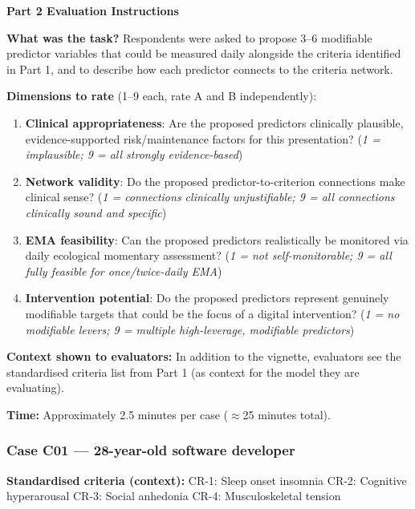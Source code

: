 \documentclass[11pt,a4paper]{article}
\begin{document}
\begin{tcolorbox}[colback=PartTwoBG,colframe=ForestGreen,arc=2.5mm,boxrule=0.9pt,left=10pt,right=10pt,top=9pt,bottom=9pt]
\textbf{\color{ForestGreen}Part 2 Evaluation Instructions}

\smallskip
\textbf{What was the task?} Respondents were asked to propose 3--6 modifiable predictor variables that could be measured daily alongside the criteria identified in Part 1, and to describe how each predictor connects to the criteria network.

\textbf{Dimensions to rate} (1--9 each, rate A and B independently):
\begin{enumerate}
\item \textbf{Clinical appropriateness}: Are the proposed predictors clinically plausible, evidence-supported risk/maintenance factors for this presentation? (\textit{1 = implausible; 9 = all strongly evidence-based})
\item \textbf{Network validity}: Do the proposed predictor-to-criterion connections make clinical sense? (\textit{1 = connections clinically unjustifiable; 9 = all connections clinically sound and specific})
\item \textbf{EMA feasibility}: Can the proposed predictors realistically be monitored via daily ecological momentary assessment? (\textit{1 = not self-monitorable; 9 = all fully feasible for once/twice-daily EMA})
\item \textbf{Intervention potential}: Do the proposed predictors represent genuinely modifiable targets that could be the focus of a digital intervention? (\textit{1 = no modifiable levers; 9 = multiple high-leverage, modifiable predictors})
\end{enumerate}

\textbf{Context shown to evaluators:} In addition to the vignette, evaluators see the standardised criteria list from Part 1 (as context for the model they are evaluating).

\textbf{Time:} Approximately 2.5 minutes per case ($\approx$25 minutes total).
\end{tcolorbox}

\vspace{0.5em}


\subsubsection*{Case C01 --- 28-year-old software developer}
\begin{vignettebox}
\small\textbf{Standardised criteria (context):} CR-1: Sleep onset insomnia \quad CR-2: Cognitive hyperarousal \quad CR-3: Social anhedonia \quad CR-4: Musculoskeletal tension
\end{vignettebox}
\end{document}
